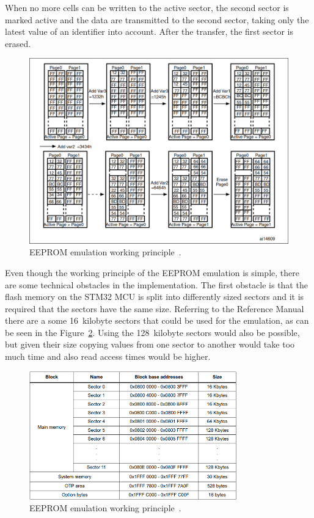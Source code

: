 When no more cells can be written to the active sector, the second sector is marked active and the data are transmitted to the second sector, taking only the latest value of an identifier into account.
After the transfer, the first sector is erased.

\begin{figure}[H]
    \centering
    \includegraphics[width=\textwidth]{obrazky/eeprom_emul_principle}
    \caption{EEPROM emulation working principle~\cite{eeprom_appnote}.}
    \label{fig:eeprom_emul}
\end{figure}

Even though the working principle of the EEPROM emulation is simple, there are some technical obstacles in the implementation.
The first obstacle is that the flash memory on the STM32 MCU is split into differently sized sectors and it is required that the sectors have the same size.
Referring to the Reference Manual~\cite{stm32f405_ref_manual} there are a some 16~kilobyte sectors that could be used for the emulation, as can be seen in the Figure~\ref{fig:flash_layout}.
Using the 128~kilobyte sectors would also be possible, but given their size copying values from one sector to another would take too much time and also read access times would be higher.

\begin{figure}[H]
    \centering
    \includegraphics[width=0.8\textwidth]{obrazky/flash_stm}
    \caption{EEPROM emulation working principle~\cite{stm32f405_ref_manual}.}
    \label{fig:flash_layout}
\end{figure}

